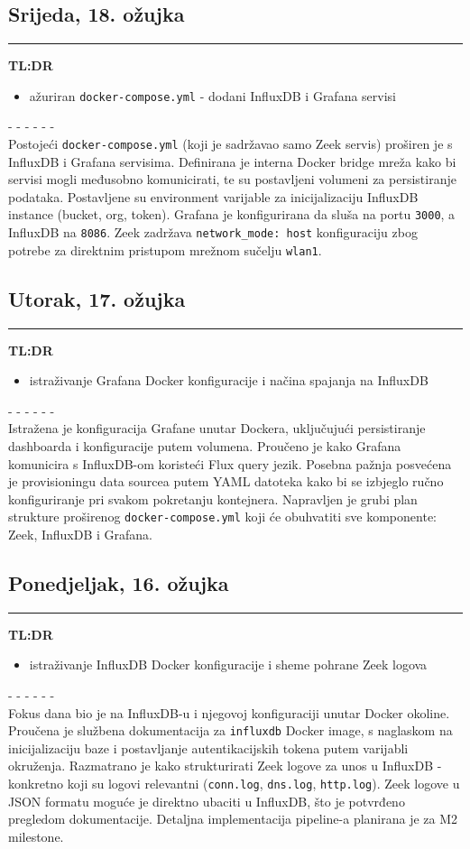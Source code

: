 \documentclass[12pt, a4paper]{article}
\newcommand{\dan}[1]{
    \subsection*{#1}
    \vspace{-0.5em} 
    \hrule \vspace{0.5em} 
}
\begin{document}
\dan{Srijeda, 18. ožujka}
\textbf{TL:DR}
\begin{itemize}
    \item ažuriran \lstinline|docker-compose.yml| - dodani InfluxDB i Grafana servisi
\end{itemize}
- - - - - - \\
Postojeći \lstinline|docker-compose.yml| (koji je sadržavao samo Zeek servis) proširen je s InfluxDB i Grafana servisima.
Definirana je interna Docker bridge mreža kako bi servisi mogli međusobno komunicirati, te su postavljeni volumeni za persistiranje podataka.
Postavljene su environment varijable za inicijalizaciju InfluxDB instance (bucket, org, token).
Grafana je konfigurirana da sluša na portu \lstinline|3000|, a InfluxDB na \lstinline|8086|.
Zeek zadržava \lstinline|network_mode: host| konfiguraciju zbog potrebe za direktnim pristupom mrežnom sučelju \lstinline|wlan1|.
 
\dan{Utorak, 17. ožujka}
\textbf{TL:DR}
\begin{itemize}
    \item istraživanje Grafana Docker konfiguracije i načina spajanja na InfluxDB
\end{itemize}
- - - - - - \\
Istražena je konfiguracija Grafane unutar Dockera, uključujući persistiranje dashboarda i konfiguracije putem volumena.
Proučeno je kako Grafana komunicira s InfluxDB-om koristeći Flux query jezik.
Posebna pažnja posvećena je provisioningu data sourcea putem YAML datoteka kako bi se izbjeglo ručno konfiguriranje pri svakom pokretanju kontejnera.
Napravljen je grubi plan strukture proširenog \lstinline|docker-compose.yml| koji će obuhvatiti sve komponente: Zeek, InfluxDB i Grafana.
 
\dan{Ponedjeljak, 16. ožujka}
\textbf{TL:DR}
\begin{itemize}
    \item istraživanje InfluxDB Docker konfiguracije i sheme pohrane Zeek logova
\end{itemize}
- - - - - - \\
Fokus dana bio je na InfluxDB-u i njegovoj konfiguraciji unutar Docker okoline.
Proučena je službena dokumentacija za \lstinline|influxdb| Docker image, s naglaskom na inicijalizaciju baze i postavljanje autentikacijskih tokena putem varijabli okruženja.
Razmatrano je kako strukturirati Zeek logove za unos u InfluxDB - konkretno koji su logovi relevantni (\lstinline|conn.log|, \lstinline|dns.log|, \lstinline|http.log|).
Zeek logove u JSON formatu moguće je direktno ubaciti u InfluxDB, što je potvrđeno pregledom dokumentacije.
Detaljna implementacija pipeline-a planirana je za M2 milestone.
 
\end{document}
